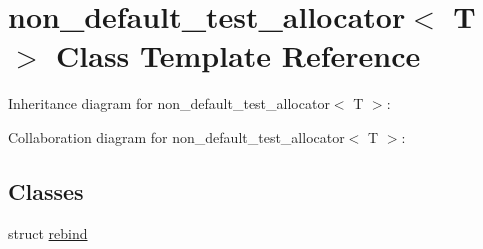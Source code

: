 \hypertarget{classnon__default__test__allocator}{}\section{non\+\_\+default\+\_\+test\+\_\+allocator$<$ T $>$ Class Template Reference}
\label{classnon__default__test__allocator}


Inheritance diagram for non\+\_\+default\+\_\+test\+\_\+allocator$<$ T $>$\+:


Collaboration diagram for non\+\_\+default\+\_\+test\+\_\+allocator$<$ T $>$\+:
\subsection*{Classes}
\begin{DoxyCompactItemize}
\item 
struct \mbox{\hyperlink{structnon__default__test__allocator_1_1rebind}{rebind}}
\end{DoxyCompactItemize}
